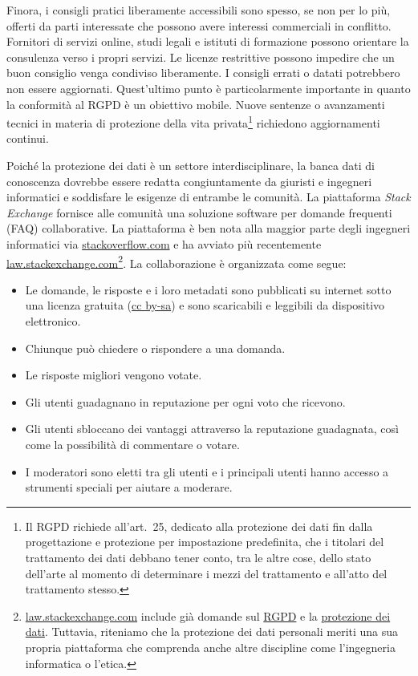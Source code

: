 \documentclass{scrlttr2}
\let\tightlist\relax
\begin{document}
\begin{letter}{}
Finora, i consigli pratici liberamente accessibili sono spesso, se non
per lo più, offerti da parti interessate che possono avere interessi
commerciali in conflitto. Fornitori di servizi online, studi legali e
istituti di formazione possono orientare la consulenza verso i propri
servizi. Le licenze restrittive possono impedire che un buon consiglio
venga condiviso liberamente. I consigli errati o datati potrebbero non
essere aggiornati. Quest'ultimo punto è particolarmente importante in
quanto la conformità al RGPD è un obiettivo mobile. Nuove sentenze o
avanzamenti tecnici in materia di protezione della vita
privata\footnote{Il RGPD richiede all'art.~25, dedicato alla protezione
  dei dati fin dalla progettazione e protezione per impostazione
  predefinita, che i titolari del trattamento dei dati debbano tener
  conto, tra le altre cose, dello stato dell'arte al momento di
  determinare i mezzi del trattamento e all'atto del trattamento stesso.}
richiedono aggiornamenti continui.

Poiché la protezione dei dati è un settore interdisciplinare, la banca
dati di conoscenza dovrebbe essere redatta congiuntamente da giuristi e
ingegneri informatici e soddisfare le esigenze di entrambe le comunità.
La piattaforma \emph{Stack Exchange} fornisce alle comunità una
soluzione software per domande frequenti (FAQ) collaborative. La
piattaforma è ben nota alla maggior parte degli ingegneri informatici
via \href{https://stackoverflow.com}{stackoverflow.com} e ha avviato più
recentemente
\href{https://law.stackexchange.com}{law.stackexchange.com}\footnote{\href{https://law.stackexchange.com}{law.stackexchange.com}
  include già domande sul
  \href{https://law.stackexchange.com/questions/tagged/gdpr}{RGPD} e la
  \href{https://law.stackexchange.com/questions/tagged/gdpr+data-protection}{protezione
  dei dati}. Tuttavia, riteniamo che la protezione dei dati personali
  meriti una sua propria piattaforma che comprenda anche altre
  discipline come l'ingegneria informatica o l'etica.}. La
collaborazione è organizzata come segue:

\begin{itemize}
\tightlist
\item
  Le domande, le risposte e i loro metadati sono pubblicati su internet
  sotto una licenza gratuita
  (\href{https://creativecommons.org/licenses/by-sa/3.0/}{cc by-sa}) e
  sono scaricabili e leggibili da dispositivo elettronico.
\item
  Chiunque può chiedere o rispondere a una domanda.
\item
  Le risposte migliori vengono votate.
\item
  Gli utenti guadagnano in reputazione per ogni voto che ricevono.
\item
  Gli utenti sbloccano dei vantaggi attraverso la reputazione
  guadagnata, così come la possibilità di commentare o votare.
\item
  I moderatori sono eletti tra gli utenti e i principali utenti hanno
  accesso a strumenti speciali per aiutare a moderare.
\end{itemize}


\end{letter}
\end{document}
